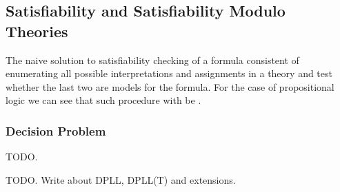 \subsection{Satisfiability and Satisfiability Modulo Theories}
 
The naive solution to satisfiability checking of a formula
consistent of enumerating all possible interpretations 
and assignments in a theory and test whether the last two are 
models for the formula. For the case of propositional logic 
we can see that such procedure with be .

\subsubsection{Decision Problem}

TODO.

TODO. Write about DPLL, DPLL(T) and extensions.

